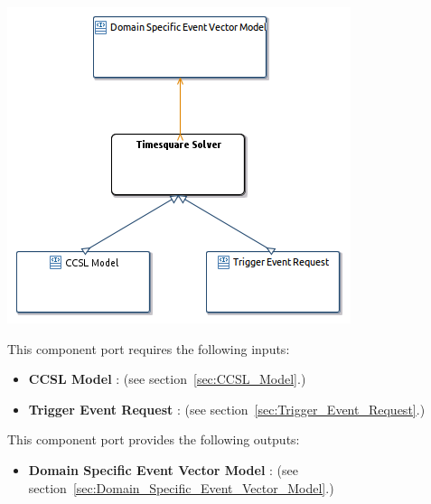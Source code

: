 \documentclass{gemoc} %
\begin{document}

\begin{center}
\includegraphics*[trim=0.0cm 0.0cm 0cm 0.0cm, clip=true]{../images/generated/Generated_Timesquare_Solver.png}
\end{center}

This component port requires the following inputs:
\begin{itemize}
  \item \textbf{CCSL Model} :
(see section~\ref{sec:CCSL_Model}.)
  \item \textbf{Trigger Event Request} :
(see section~\ref{sec:Trigger_Event_Request}.)
\end{itemize}

This component port provides the following outputs:
\begin{itemize}
  \item \textbf{Domain Specific Event Vector Model} :
(see section~\ref{sec:Domain_Specific_Event_Vector_Model}.)
\end{itemize}
\end{document}
